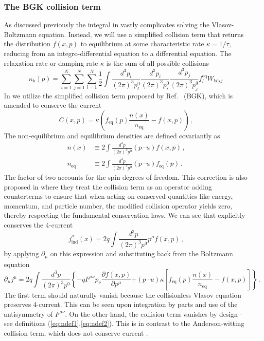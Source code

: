 \subsubsection{The BGK collision term}
As discussed previously the integral in  vastly complicates solving the Vlasov-Boltzmann equation. Instead, we will use a simplified collision term that returns the distribution $f(x,p)$ to equilibrium at some characteristic rate $\kappa = 1/\tau$, reducing  from an integro-differential equation to a differential equation. The relaxation rate or damping rate $\kappa$ is the sum of all possible collisions~\cite{Das:2021bkz}
\begin{equation}
    \kappa_k(p) = \sum^N_{i=1}\sum^N_{j=1}\sum^N_{l=1} \frac{1}{2}\int\frac{d^3p_l}{(2 \pi)^3p_l^0}\frac{d^3p_i}{(2 \pi)^3p_i^0}\frac{d^3p_j}{(2 \pi)^3p_j^0}f_l^{\text{eq}}W_{kl|ij}\,
\end{equation}
In \cite{Formanek:2021blc} we utilize the simplified collision term proposed by Ref.~\cite{Bhatnagar:1954zz} (BGK), which is amended to conserve the current 
\begin{equation}\label{eq:collision}
    \boxed{C(x,p) =\kappa\left(f_{\text{eq}}(p)\frac{n(x)}{{n_{\text{eq}}}} - f(x,p)\right)}\,,
\end{equation}
The non-equilibrium and equilibrium densities are defined covariantly as
\begin{align}
\label{eq:ndef1}n(x) &\equiv 2 \int \frac{d^3p}{(2\pi)^3p^0}(p \cdot u)f(x,p)\,,\\
\label{eq:ndef2}n_\mathrm{eq} &\equiv 2\int \frac{d^3p}{(2\pi)^3p^0}(p \cdot u) f_\mathrm{eq}(p)\,.
\end{align}
The factor of two accounts for the spin degrees of freedom. This correction is also proposed in \cite{Rocha:2021zcw} where they treat the collision term as an operator adding counterterms to ensure that when acting on conserved quantities like energy, momentum, and particle number, the modified collision operator yields zero, thereby respecting the fundamental conservation laws. We can see that  explicitly conserves the 4-current~\cite{Formanek:2021blc}
\begin{equation}\label{eq:jmudef}
j_{\mathrm{ind}}^\mu (x)= 2q \int \frac{d^3p}{(2\pi)^3p^0}p^\mu f(x,p)\,,
\end{equation}
by applying $\partial_\mu$ on this expression and substituting back from the Boltzmann equation 
\begin{equation}
\partial_\mu j^\mu = 2q \int \frac{d^3p}{(2\pi)^3p^0} \left\{-q F^{\mu\nu}p_\nu \frac{\partial f(x,p)}{\partial p^\mu}\right. 
\left. + (p \cdot u)\kappa \left[f_\mathrm{eq}(p) \frac{n(x)}{n_\mathrm{eq}}-f(x,p) \right] \right\}\,.
\end{equation} 
The first term should naturally vanish because the collisionless Vlasov equation preserves 4-current. This can be seen upon integration by parts and use of the antisymmetry of $F^{\mu\nu}$. On the other hand, the collision term vanishes by design - see definitions (\ref{eq:ndef1},\ref{eq:ndef2}). This is in contrast to the Anderson-witting collision term, which does not conserve current .


